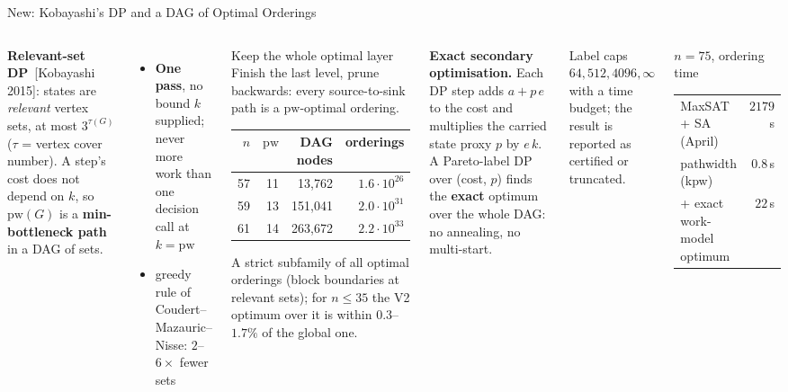 \documentclass[aspectratio=169,t]{beamer}
\newcommand{\pw}{\mathrm{pw}}
\begin{document}
\begin{frame}{New: Kobayashi's DP and a DAG of Optimal Orderings}
\scriptsize
\begin{columns}[t]
\textbf{Relevant-set DP}~[Kobayashi 2015]: states are \emph{relevant}
vertex sets, at most $3^{\tau(G)}$ ($\tau$ = vertex cover number).
A step's cost does not depend on $k$, so $\pw(G)$ is a
\textbf{min-bottleneck path} in a DAG of sets.
\begin{itemize}
  \item \textbf{One pass}, no bound $k$ supplied; never more work than
        one decision call at $k=\pw$
  \item greedy rule of Coudert--Mazauric--Nisse: $2$--$6\times$ fewer sets
\end{itemize}

\vspace{0.05cm}
\begin{block}{Keep the whole optimal layer}
Finish the last level, prune backwards: every source-to-sink path is a
$\pw$-optimal ordering.
\begin{center}\vspace{-0.15cm}
\begin{tabular}{rrrr}
\toprule
$n$ & $\pw$ & DAG nodes & orderings \\
\midrule
57 & 11 & 13{,}762  & $1.6\cdot10^{26}$ \\
59 & 13 & 151{,}041 & $2.0\cdot10^{31}$ \\
61 & 14 & 263{,}672 & $2.2\cdot10^{33}$ \\
\bottomrule
\end{tabular}
\end{center}
\vspace{-0.15cm}
{\tiny A strict subfamily of all optimal orderings (block boundaries
at relevant sets); for $n\le35$ the V2 optimum over it is within
$0.3$--$1.7\%$ of the global one.}
\end{block}

\textbf{Exact secondary optimisation.}
Each DP step adds $a+p\,e$ to the cost and multiplies the carried
state proxy $p$ by $e\,k$. A Pareto-label DP over (cost, $p$) finds the
\textbf{exact} optimum over the whole DAG: no annealing, no multi-start.

\vspace{0.05cm}
{\tiny Label caps $64,512,4096,\infty$ with a time budget; the
result is reported as certified or truncated.}

\vspace{0.05cm}
\begin{exampleblock}{$n=75$, ordering time}
\begin{tabular}{lr}
MaxSAT + SA (April) & $2179$\,s \\
pathwidth (kpw) & $0.8$\,s \\
+ exact work-model optimum & $22$\,s \\
\end{tabular}
\end{exampleblock}


\end{columns}
\end{frame}
\end{document}
